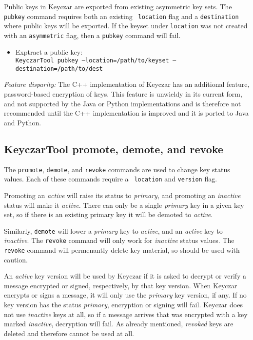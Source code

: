 \documentclass{llncs}
\begin{document}
Public keys in Keyczar are exported from existing asymmetric key
sets. The {\tt pubkey} command requires both an existing {\tt
  location} flag and a {\tt destination} where public keys will be
exported. If the keyset under {\tt location} was not created with an
{\tt asymmetric} flag, then a {\tt pubkey} command will fail.

\begin{itemize}
\item Exptract a public key: \\
{\tt KeyczarTool pubkey --location=/path/to/keyset
  --destination=/path/to/dest}
\end{itemize}

\emph{Feature disparity:} The C++ implementation of Keyczar has an
additional feature, password-based encryption of keys.  This feature
is unwieldy in its current form, and not supported by the Java or
Python implementations and is therefore not recommended until the C++
implementation is improved and it is ported to Java and Python.

\subsection{KeyczarTool promote, demote, and revoke}

The {\tt promote}, {\tt demote}, and {\tt revoke} commands are used to
change key status values. Each of these commands require a {\tt
  location} and {\tt version} flag.

Promoting an {\it active} will raise its status to {\it primary}, and
promoting an {\it inactive} status will make it {\it active}. There
can only be a single {\it primary} key in a given key set, so if there
is an existing primary key it will be demoted to {\it active}.

Similarly, {\tt demote} will lower a {\it primary} key to {\it
  active}, and an {\it active} key to {\it inactive}. The {\tt revoke}
command will only work for {\it inactive} status values.  The {\tt
  revoke} command will permenantly delete key material, so should be
used with caution.

An {\it active} key version will be used by Keyczar if it is asked to
decrypt or verify a message encrypted or signed, respectively, by that
key version.  When Keyczar encrypts or signs a message, it will only
use the {\it primary} key version, if any.  If no key version has the
status {\it primary}, encryption or signing will fail.  Keyczar does
not use {\it inactive} keys at all, so if a message arrives that was
encrypted with a key marked {\it inactive}, decryption will fail.  As
already mentioned, {\it revoked} keys are deleted and therefore cannot
be used at all.
\end{document}

